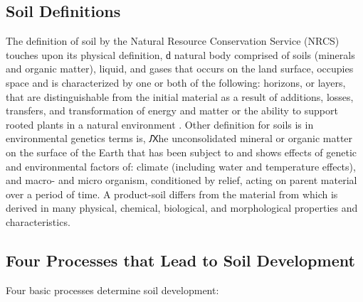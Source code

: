 \subsection{Soil Definitions}

The definition of soil by the Natural Resource Conservation Service (NRCS) touches upon its physical definition, ԁ natural body comprised of soils (minerals and organic matter), liquid, and gases that occurs on the land surface, occupies space and is characterized by one or both of the following: horizons, or layers, that are distinguishable from the initial material as a result of additions, losses, transfers, and transformation of energy and matter or the ability to support rooted plants in a natural environment \citep{baillie2001soil}. Other definition for soils is in environmental genetics terms is, Ԕhe unconsolidated mineral or organic matter on the surface of the Earth that has been subject to and shows effects of genetic and environmental factors of: climate (including water and temperature effects), and macro- and micro organism, conditioned by relief, acting on parent material over a period of time. A product-soil differs from the material from which is derived in many physical, chemical, biological, and morphological properties and characteristics. 


\subsection{Four Processes that Lead to Soil Development}

Four basic processes determine soil development: 

